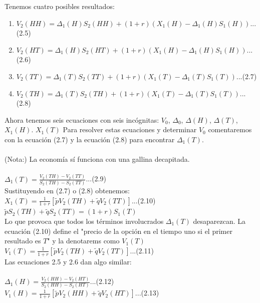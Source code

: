 \documentclass{article}
\begin{document}
        Tenemos cuatro posibles resultados:
        \begin{enumerate}
            \item \(V_2(HH) = \Delta_1(H) S_2(HH) + (1+r) (X_1(H) - \Delta_1(H) S_1(H))\)...(2.5)
            \item \(V_2(HT) = \Delta_1(H) S_2(HT) + (1+r) (X_1(H) - \Delta_1(H) S_1(H))\)...(2.6)
            \item \(V_2(TT) = \Delta_1(T) S_2(TT) + (1+r) (X_1(T) - \Delta_1(T) S_1(T))\)...(2.7)
            \item \(V_2(TH) = \Delta_1(T) S_2(TH) + (1+r) (X_1(T) - \Delta_1(T) S_1(T))\)...(2.8)
        \end{enumerate}

        Ahora tenemos seis ecuaciones con seis incógnitas: \(V_0\), \(\Delta_0\), \(\Delta(H)\), \(\Delta(T)\), \(X_1(H)\). \(X_1(T)\)
        Para resolver estas ecuaciones y determinar \(V_0\) comentaremos con la ecuación (2.7) y la ecuación (2.8) para encontrar \(\Delta_1(T)\).
        \\
        \\
        (Nota:) La economía sí funciona con una gallina decapitada.
        \\
        \\
        \(\Delta_1(T) = \frac{V_2(TH) - V_2(TT)}{S_2(TH) - S_2(TT)}\)...(2.9)
        \\
        Sustituyendo en (2.7) o (2.8) obtenemos:
        \\
        \(X_1(T) = \frac{1}{1+r}[\tilde{p} V_2(TH) + \tilde{q} V_2(TT)]\)...(2.10)
        \\
        \(\tilde{p} S_2(TH) + \tilde{q} S_2(TT) = (1+r) S_1(T)\)
        \\
        Lo que provoca que todos los términos involucrados \(\Delta_1(T)\) desaparezcan.
        La ecuación (2.10) define el "precio de la opción en el tiempo uno si el primer resultado es \(T\)" y la denotarems como \(V_1(T)\)
        \\
        \(V_1(T) = \frac{1}{1+r} [\tilde{p} V_2(TH) + \tilde{q} V_2(TT)]\)...(2.11)
        \\
        Las ecuaciones 2.5 y 2.6 dan algo similar:
        \\
        \\
        \(\Delta_1(H) = \frac{V_2(HH) - V_2(HT)}{S_2(HH) - S_2(HT)}\)...(2.12)
        \\
        \(V_1(H) = \frac{1}{1+r} [\tilde{p} V_2(HH) + \tilde{q} V_2(HT)]\)...(2.13)
        \\
\end{document}

